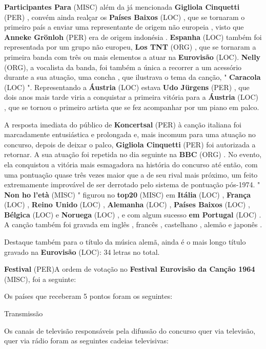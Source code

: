 \documentclass[12pt,a4paper]{article}
\begin{document}
\textbf{Participantes Para} (MISC) além da já mencionada \textbf{Gigliola Cinquetti} (PER) , convém ainda realçar os \textbf{Países Baixos} (LOC) , que se tornaram o primeiro país a enviar uma representante de origem não europeia , visto que \textbf{Anneke Grönloh} (PER) era de origem indonésia . \textbf{Espanha} (LOC) também foi representada por um grupo não europeu, \textbf{Los TNT} (ORG) , que se tornaram a primeira banda com três ou mais elementos a atuar na \textbf{Eurovisão} (LOC). \textbf{Nelly} (ORG), a vocalista da banda, foi também a única a recorrer a um acessório durante a sua atuação, uma concha , que ilustrava o tema da canção, " \textbf{Caracola} (LOC) ". Representando a \textbf{Áustria} (LOC) estava \textbf{Udo Jürgens} (PER) , que dois anos mais tarde viria a conquistar a primeira vitória para a \textbf{Áustria} (LOC) , que se tornou o primeiro artista que se fez acompanhar por um piano em palco.

A resposta imediata do público de \textbf{Koncertsal} (PER) à canção italiana foi marcadamente entusiástica e prolongada e, mais incomum para uma atuação no concurso, depois de deixar o palco, \textbf{Gigliola Cinquetti} (PER) foi autorizada a retornar. A sua atuação foi repetida no dia seguinte na \textbf{BBC} (ORG) . No evento, ela conquistou a vitória mais esmagadora na história do concurso até então, com uma pontuação quase três vezes maior que a de seu rival mais próximo, um feito extremamente improvável de ser derrotado pelo sistema de pontuação pós-1974. " \textbf{Non ho l'età} (MISC) " figurou no \textbf{top20} (MISC) em \textbf{Itália} (LOC) , \textbf{França} (LOC) , \textbf{Reino Unido} (LOC) , \textbf{Alemanha} (LOC) , \textbf{Países Baixos} (LOC) , \textbf{Bélgica} (LOC) e \textbf{Noruega} (LOC) , e com algum sucesso \textbf{em Portugal} (LOC) . A canção também foi gravada em inglês , francês , castelhano , alemão e japonês .

Destaque também para o título da música alemã, ainda é o mais longo título gravado na \textbf{Eurovisão} (LOC): 34 letras no total.



\textbf{Festival} (PER)A ordem de votação no \textbf{Festival Eurovisão da Canção 1964} (MISC), foi a seguinte:

Os países que receberam 5 pontos foram os seguintes:



Transmissão

Os canais de televisão responsáveis pela difussão do concurso quer via televisão, quer via rádio foram as seguintes cadeias televisivas:
\end{document}

